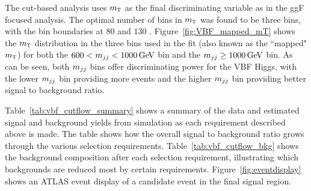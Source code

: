 The cut-based analysis uses $m_{\textrm{\footnotesize\sc t}}$ as the final discriminating variable as in the ggF focused analysis. The optimal number of bins in $m_{\textrm{\footnotesize\sc t}}$ was found to be three bins, with the bin boundaries at $80$ and $130$ \GeV. Figure~\ref{fig:VBF_mapped_mT} shows the $m_{\textrm{\footnotesize\sc t}}$ distribution in the three bins used in the fit (also known as the ``mapped" $m_{\textrm{\footnotesize\sc t}}$) for both the $600 < \mjj < 1000 \GeV$ bin and the $\mjj \geq 1000 \GeV$ bin. As can be seen, both $m_{jj}$ bins offer discriminating power for the VBF Higgs, with the lower $m_{jj}$ bin providing more events and the higher $m_{jj}$ bin providing better signal to background ratio. 

Table~\ref{tab:vbf_cutflow_summary} shows a summary of the data and estimated signal and background yields from simulation as each requirement described above is made. The table shows how the overall signal to background ratio grows through the various selection requirements. Table~\ref{tab:vbf_cutflow_bkg} shows the background composition after each selection requirement, illustrating which backgrounds are reduced most by certain requirements. Figure~\ref{fig:eventdisplay} shows an ATLAS event display of a candidate event in the final signal region. 

